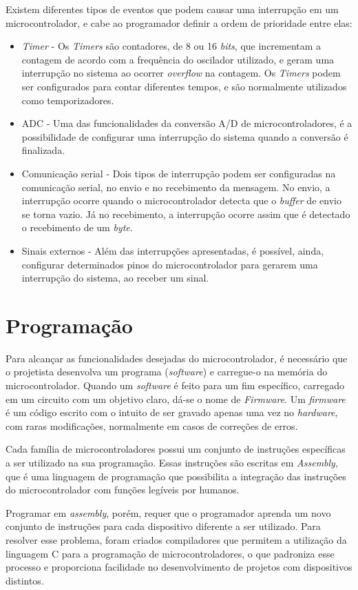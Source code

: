 Existem diferentes tipos de eventos que podem causar uma interrupção em um microcontrolador, e cabe ao programador definir a ordem de prioridade entre elas:
\begin{itemize}
\item \textit{Timer} - Os \textit{Timers} são contadores, de 8 ou 16 \textit{bits}, que incrementam a contagem de acordo com a frequência do oscilador utilizado, e geram uma interrupção no sistema ao ocorrer \textit{overflow} na contagem. Os \textit{Timers} podem ser configurados para contar diferentes tempos, e são normalmente utilizados como temporizadores.
\item \ac{ADC} - Uma das funcionalidades da conversão A/D de microcontroladores, é a possibilidade de configurar uma interrupção do sistema quando a conversão é finalizada.
\item Comunicação serial - Dois tipos de interrupção podem ser configuradas na comunicação serial, no envio e no recebimento da mensagem. No envio, a interrupção ocorre quando o microcontrolador detecta que o \textit{buffer} de envio se torna vazio. Já no recebimento, a interrupção ocorre assim que é detectado o recebimento de um \textit{byte}.
\item Sinais externos - Além das interrupções apresentadas, é possível, ainda, configurar determinados pinos do microcontrolador para gerarem uma interrupção do sistema, ao receber um sinal.
\end{itemize}

\section{Programação}

Para alcançar as funcionalidades desejadas do microcontrolador, é necessário que o projetista desenvolva um programa (\textit{software}) e carregue-o na memória do microcontrolador. Quando um \textit{software} é feito para um fim específico, carregado em um circuito com um objetivo claro, dá-se o nome de \textit{Firmware}. Um \textit{firmware} é um código escrito com o intuito de ser gravado apenas uma vez no \textit{hardware}, com raras modificações, normalmente em casos de correções de erros.

Cada família de microcontroladores possui um conjunto de instruções específicas a ser utilizado na sua programação. Essas instruções são escritas em \textit{Assembly}, que é uma linguagem de programação que possibilita a integração das instruções do microcontrolador com funções legíveis por humanos.

Programar em \textit{assembly}, porém, requer que o programador aprenda um novo conjunto de instruções para cada dispositivo diferente a ser utilizado. Para resolver esse problema, foram criados compiladores que permitem a utilização da linguagem C para a programação de microcontroladores, o que padroniza esse processo e proporciona facilidade no desenvolvimento de projetos com dispositivos distintos.



